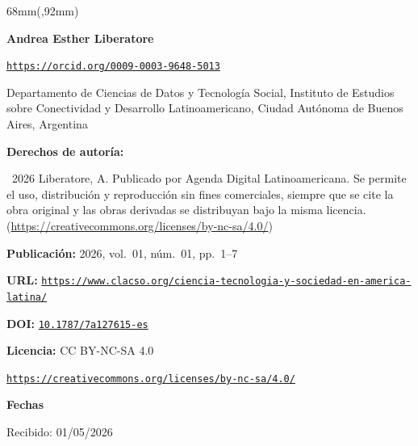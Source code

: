 \documentclass{article}
\newlength{\gbbloquex}
\begin{document}
\begin{textblock*}{68mm}(\gbbloquex,92mm)
{\setlength{\leftskip}{0pt}\setlength{\parindent}{0pt}%
\noindent\begin{minipage}[t]{68mm}
\sffamily\small\setlength{\parskip}{1pt}
{\bfseries\color{azulrevista}Andrea Esther Liberatore}\par
{\scriptsize\texttt{\href{https://orcid.org/0009-0003-9648-5013}{https://orcid.org/0009-0003-9648-5013}}}\par
Departamento de Ciencias de Datos y Tecnología Social, Instituto de Estudios sobre Conectividad y Desarrollo Latinoamericano, Ciudad Autónoma de Buenos Aires, Argentina\par
\vspace{6pt}
{\bfseries\color{azulrevista!70}Derechos de autor\'ia:}\par
\textcopyright\ 2026 Liberatore, A. Publicado por Agenda Digital Latinoamericana. Se permite el uso, distribución y reproducción sin fines comerciales, siempre que se cite la obra original y las obras derivadas se distribuyan bajo la misma licencia. (\href{https://creativecommons.org/licenses/by-nc-sa/4.0/}{https://creativecommons.org/licenses/by-nc-sa/4.0/})\par\vspace{6pt}
{\bfseries\color{azulrevista!70}Publicación:} 2026, vol.~01, n\'um.~01, pp.~1--7\par\vspace{6pt}
{\bfseries\color{azulrevista!70}URL:} {\scriptsize\texttt{\href{https://www.clacso.org/ciencia-tecnologia-y-sociedad-en-america-latina/}{https://www.clacso.org/ciencia-tecnologia-y-sociedad-en-america-latina/}}}\par\vspace{6pt}
{\bfseries\color{azulrevista!70}DOI:} {\scriptsize\texttt{\href{https://doi.org/10.1787/7a127615-es}{10.1787/7a127615-es}}}\par\vspace{6pt}
{\bfseries\color{azulrevista!70}Licencia:} CC BY-NC-SA 4.0\par
{\scriptsize\texttt{\href{https://creativecommons.org/licenses/by-nc-sa/4.0/}{https://creativecommons.org/licenses/by-nc-sa/4.0/}}}\par
\vspace{6pt}
{\bfseries\color{azulrevista!70}Fechas}\par\vspace{2pt}
Recibido: 01/05/2026\par

\end{minipage}}
\end{textblock*}
\end{document}
